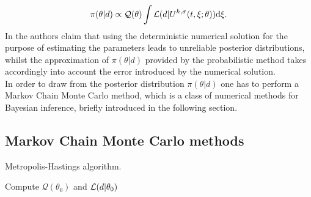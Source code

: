  \begin{equation}
	 	\pi(\theta|d) \propto \mathcal{Q}(\theta) \int{\mathcal{L}(d|U^{h,\sigma}(t,\xi;\theta))\dd\xi}.
 \end{equation}
 In \cite{CGS16} the authors claim that using the deterministic numerical solution for the purpose of estimating the parameters leads to unreliable posterior distributions, whilst the approximation of $\pi(\theta|d)$ provided by the probabilistic method takes accordingly into account the error introduced by the numerical solution. \\
 In order to draw from the posterior distribution $\pi(\theta|d)$ one has to perform a Markov Chain Monte Carlo method, which is a class of numerical methods for Bayesian inference, briefly introduced in the following section.
 
\subsection{Markov Chain Monte Carlo methods}

\begin{algorithm}[t]
	\caption{Metropolis-Hastings algorithm.}
	\label{alg:MH}
	Compute $\mathcal{Q}(\theta_0)$ and $\mathcal{L}(d|\theta_0)$ \;
\end{algorithm}

